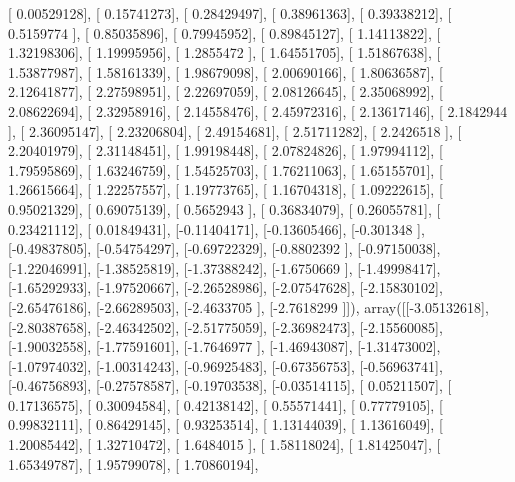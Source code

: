 \documentclass{article}
\begin{document}
       [ 0.00529128],
       [ 0.15741273],
       [ 0.28429497],
       [ 0.38961363],
       [ 0.39338212],
       [ 0.5159774 ],
       [ 0.85035896],
       [ 0.79945952],
       [ 0.89845127],
       [ 1.14113822],
       [ 1.32198306],
       [ 1.19995956],
       [ 1.2855472 ],
       [ 1.64551705],
       [ 1.51867638],
       [ 1.53877987],
       [ 1.58161339],
       [ 1.98679098],
       [ 2.00690166],
       [ 1.80636587],
       [ 2.12641877],
       [ 2.27598951],
       [ 2.22697059],
       [ 2.08126645],
       [ 2.35068992],
       [ 2.08622694],
       [ 2.32958916],
       [ 2.14558476],
       [ 2.45972316],
       [ 2.13617146],
       [ 2.1842944 ],
       [ 2.36095147],
       [ 2.23206804],
       [ 2.49154681],
       [ 2.51711282],
       [ 2.2426518 ],
       [ 2.20401979],
       [ 2.31148451],
       [ 1.99198448],
       [ 2.07824826],
       [ 1.97994112],
       [ 1.79595869],
       [ 1.63246759],
       [ 1.54525703],
       [ 1.76211063],
       [ 1.65155701],
       [ 1.26615664],
       [ 1.22257557],
       [ 1.19773765],
       [ 1.16704318],
       [ 1.09222615],
       [ 0.95021329],
       [ 0.69075139],
       [ 0.5652943 ],
       [ 0.36834079],
       [ 0.26055781],
       [ 0.23421112],
       [ 0.01849431],
       [-0.11404171],
       [-0.13605466],
       [-0.301348  ],
       [-0.49837805],
       [-0.54754297],
       [-0.69722329],
       [-0.8802392 ],
       [-0.97150038],
       [-1.22046991],
       [-1.38525819],
       [-1.37388242],
       [-1.6750669 ],
       [-1.49998417],
       [-1.65292933],
       [-1.97520667],
       [-2.26528986],
       [-2.07547628],
       [-2.15830102],
       [-2.65476186],
       [-2.66289503],
       [-2.4633705 ],
       [-2.7618299 ]]), array([[-3.05132618],
       [-2.80387658],
       [-2.46342502],
       [-2.51775059],
       [-2.36982473],
       [-2.15560085],
       [-1.90032558],
       [-1.77591601],
       [-1.7646977 ],
       [-1.46943087],
       [-1.31473002],
       [-1.07974032],
       [-1.00314243],
       [-0.96925483],
       [-0.67356753],
       [-0.56963741],
       [-0.46756893],
       [-0.27578587],
       [-0.19703538],
       [-0.03514115],
       [ 0.05211507],
       [ 0.17136575],
       [ 0.30094584],
       [ 0.42138142],
       [ 0.55571441],
       [ 0.77779105],
       [ 0.99832111],
       [ 0.86429145],
       [ 0.93253514],
       [ 1.13144039],
       [ 1.13616049],
       [ 1.20085442],
       [ 1.32710472],
       [ 1.6484015 ],
       [ 1.58118024],
       [ 1.81425047],
       [ 1.65349787],
       [ 1.95799078],
       [ 1.70860194],
\end{document}
